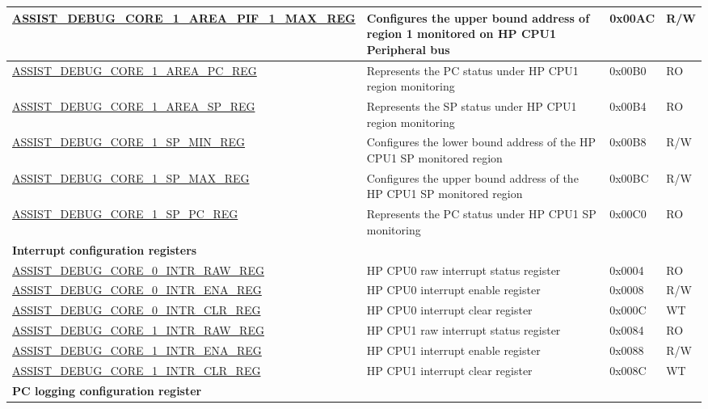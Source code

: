 \begin{longtable}{ | p{8.7cm} | m{5.3cm} | p{1.2cm} | p{1.2cm} | }
\hyperref[regdesc:ASSISTDEBUGCORE1AREAPIF1MAXREG]{ASSIST\_DEBUG\_CORE\_1\_AREA\_PIF\_1\_MAX\_REG} & Configures the upper bound address of region 1 monitored on HP CPU1 Peripheral bus & 0x00AC & R/W \\ \hline
\hyperref[regdesc:ASSISTDEBUGCORE1AREAPCREG]{ASSIST\_DEBUG\_CORE\_1\_AREA\_PC\_REG} & Represents the PC status under HP CPU1 region monitoring & 0x00B0 & RO \\ \hline
\hyperref[regdesc:ASSISTDEBUGCORE1AREASPREG]{ASSIST\_DEBUG\_CORE\_1\_AREA\_SP\_REG} & Represents the SP status under HP CPU1 region monitoring & 0x00B4 & RO \\ \hline
\hyperref[regdesc:ASSISTDEBUGCORE1SPMINREG]{ASSIST\_DEBUG\_CORE\_1\_SP\_MIN\_REG} & Configures the lower bound address of the HP CPU1 SP monitored region & 0x00B8 &R/W \\ \hline
\hyperref[regdesc:ASSISTDEBUGCORE1SPMAXREG]{ASSIST\_DEBUG\_CORE\_1\_SP\_MAX\_REG} & Configures the upper bound address of the HP CPU1 SP monitored region & 0x00BC &R/W \\ \hline
\hyperref[regdesc:ASSISTDEBUGCORE1SPPCREG]{ASSIST\_DEBUG\_CORE\_1\_SP\_PC\_REG} & Represents the PC status under HP CPU1 SP monitoring & 0x00C0 & RO \\ \hline
\multicolumn{4}{|l|}{\textbf{Interrupt configuration registers}} \\ \hline
\hyperref[regdesc:ASSISTDEBUGCORE0INTRRAWREG]{ASSIST\_DEBUG\_CORE\_0\_INTR\_RAW\_REG} & HP CPU0 raw interrupt status register & 0x0004 & RO \\ \hline
\hyperref[regdesc:ASSISTDEBUGCORE0INTRENAREG]{ASSIST\_DEBUG\_CORE\_0\_INTR\_ENA\_REG} & HP CPU0 interrupt enable register & 0x0008 & R/W \\ \hline
\hyperref[regdesc:ASSISTDEBUGCORE0INTRCLRREG]{ASSIST\_DEBUG\_CORE\_0\_INTR\_CLR\_REG} & HP CPU0 interrupt clear register & 0x000C & WT \\ \hline
\hyperref[regdesc:ASSISTDEBUGCORE1INTRRAWREG]{ASSIST\_DEBUG\_CORE\_1\_INTR\_RAW\_REG} & HP CPU1 raw interrupt status register & 0x0084 & RO \\ \hline
\hyperref[regdesc:ASSISTDEBUGCORE1INTRENAREG]{ASSIST\_DEBUG\_CORE\_1\_INTR\_ENA\_REG} & HP CPU1 interrupt enable register & 0x0088 & R/W \\ \hline
\hyperref[regdesc:ASSISTDEBUGCORE1INTRCLRREG]{ASSIST\_DEBUG\_CORE\_1\_INTR\_CLR\_REG} & HP CPU1 interrupt clear register & 0x008C & WT \\ \hline
\multicolumn{4}{|l|}{\textbf{PC logging configuration register}} \\ \hline

\end{longtable}
